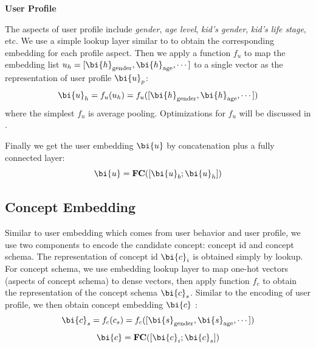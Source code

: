\noindent
\textbf{User Profile}

\noindent
The aspects of user profile include \textit{gender}, \textit{age level}, \textit{kid's gender}, \textit{kid's life stage}, etc.
We use a simple lookup layer similar to  to obtain the corresponding embedding for each profile aspect.
Then we apply a function $f_{u}$ to map the embedding list 
$u_h = [\bi{h}_{\text{gender}}, \bi{h}_{\text{age}}, \cdots]$ to a single vector as the representation of user profile $\bi{u}_p$:
\begin{equation}
\label{eqn:fu}
\bi{u}_h = f_u(u_h) = f_u([\bi{h}_{\text{gender}}, \bi{h}_{\text{age}}, \cdots])
\end{equation}
where the simplest $f_u$ is average pooling. Optimizations for $f_u$ will be discussed in .

Finally we get the user embedding $\bi{u}$ by concatenation plus a fully connected layer:
\begin{equation}
\bi{u} = \textbf{FC}([\bi{u}_{b};\bi{u}_{h}])
\end{equation}

\subsection{Concept Embedding}

Similar to user embedding which comes from user behavior and user profile, we use two components to encode the candidate concept: concept id and concept schema.
The representation of concept id $\bi{c}_i$ is obtained simply by lookup.
For concept schema,
we use embedding lookup layer to map one-hot vectors (aspects of concept schema) to dense vectors, then apply function $f_{c}$ to obtain
the representation of the concept schema $\bi{c}_s$. 
Similar to the encoding of user profile,
we then obtain concept embedding $\bi{c}$ :
\begin{equation}
\label{eqn:fc}
\bi{c}_s = f_c(c_s) = f_c([\bi{s}_{\text{gender}}, \bi{s}_{\text{age}}, \cdots])
\end{equation}
\begin{equation}
\bi{c} = \textbf{FC}([\bi{c}_{i};\bi{c}_{s}])
\end{equation}

